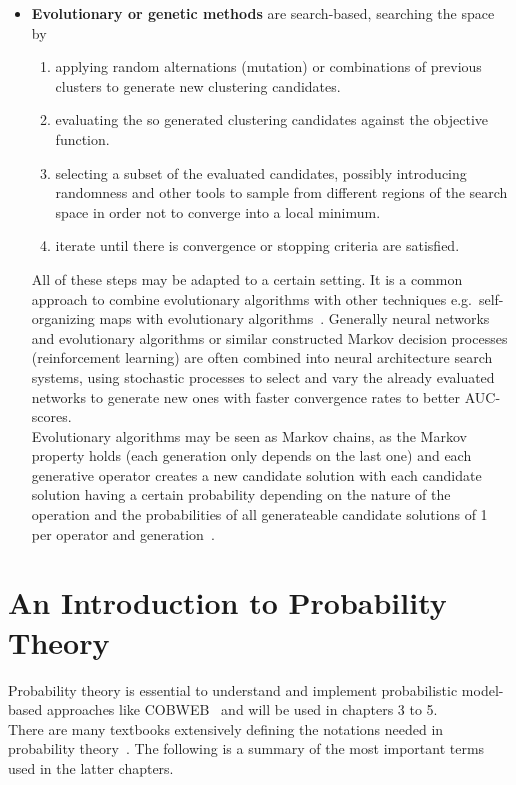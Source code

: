 \begin{itemize}
    \item \textbf{Evolutionary or genetic methods} are search-based, searching the space by 
        \begin{enumerate}
            \item applying random alternations (mutation) or combinations of previous clusters to generate new clustering candidates.
            \item evaluating the so generated clustering candidates against the objective function.
            \item selecting a subset of the evaluated candidates, possibly introducing randomness and other tools to sample from different regions of the search space in order not to converge into a local minimum.
            \item iterate until there is convergence or stopping criteria are satisfied.
        \end{enumerate}
        All of these steps may be adapted to a certain setting. It is a common approach to combine evolutionary algorithms with other techniques e.g.~self-organizing maps with evolutionary algorithms~\cite{leng2006design}. 
        Generally neural networks and evolutionary algorithms or similar constructed Markov decision processes (reinforcement learning) are often combined into neural architecture search systems, using stochastic processes to select and vary the already evaluated networks to generate new ones with faster convergence rates to better AUC-scores\cite{kandasamy2018neural}. \\
        Evolutionary algorithms may be seen as Markov chains, as the Markov property holds (each generation only depends on the last one) and each generative operator creates a new candidate solution with each candidate solution having a certain probability depending on the nature of the operation and the probabilities of all generateable candidate solutions of 1 per operator and generation~\cite{Nix1992}.
\end{itemize}

\section{An Introduction to Probability Theory}\label{\positionnumber}
Probability theory is essential to understand and implement probabilistic model-based approaches like COBWEB~\cite{Fisher1987} and will be used in chapters 3 to 5. \\
There are many textbooks extensively defining the notations needed in probability theory~\cite{Baron:2013:PSC:2536837, fahrmeir2016statistik}. The following is a summary of the most important terms used in the latter chapters.\\

